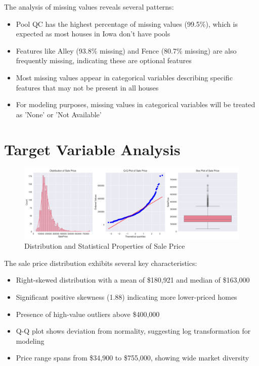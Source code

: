 \documentclass[12pt]{report}
\begin{document}
The analysis of missing values reveals several patterns:
\begin{itemize}
    \item Pool QC has the highest percentage of missing values (99.5\%), which is expected as most houses in Iowa don't have pools
    \item Features like Alley (93.8\% missing) and Fence (80.7\% missing) are also frequently missing, indicating these are optional features
    \item Most missing values appear in categorical variables describing specific features that may not be present in all houses
    \item For modeling purposes, missing values in categorical variables will be treated as 'None' or 'Not Available'
\end{itemize}

\section{Target Variable Analysis}
\begin{figure}[H]
    \centering
    \includegraphics[width=1.0\textwidth]{figures/sale_price_distribution.png}
    \caption{Distribution and Statistical Properties of Sale Price}
    \label{fig:sale_price_dist}
\end{figure}

The sale price distribution exhibits several key characteristics:
\begin{itemize}
    \item Right-skewed distribution with a mean of \$180,921 and median of \$163,000
    \item Significant positive skewness (1.88) indicating more lower-priced homes
    \item Presence of high-value outliers above \$400,000
    \item Q-Q plot shows deviation from normality, suggesting log transformation for modeling
    \item Price range spans from \$34,900 to \$755,000, showing wide market diversity
\end{itemize}
\end{document}
